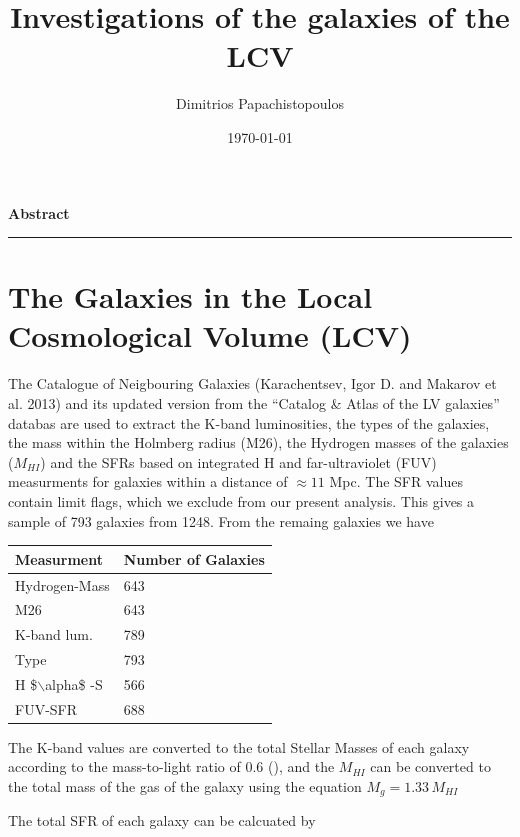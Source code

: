 \documentclass[a4paper]{article}
\author{Dimitrios Papachistopoulos}
\date{\today}
\title{Investigations of the galaxies of the LCV}
\begin{document}
\maketitle
\begin{ABSTRACT}


\textbf{Abstract}

\noindent\rule{\textwidth}{0.5pt}
\end{ABSTRACT}


\section{The Galaxies in the Local Cosmological Volume (LCV)}
\label{sec:org630e55f}

The Catalogue of Neigbouring Galaxies (Karachentsev, Igor D. and Makarov  et al. 2013\autocite{karachentsevUPDATEDNEARBYGALAXY2013}) and its updated version from the ``Catalog \& Atlas of the LV galaxies'' databas\autocite{CatalogLVGalaxies}  are used to extract the K-band luminosities, the types of the galaxies, the mass within the Holmberg radius (M26), the Hydrogen masses of the galaxies (\(M_{HI}\)) and the SFRs based on integrated  H and far-ultraviolet (FUV) measurments for galaxies within a distance of
\(\approx 11\) Mpc. The SFR values contain limit flags, which we exclude from our present analysis. This gives a sample of 793 galaxies from 1248. From the remaing galaxies we have

\begin{center}
\begin{tabular}{|l|l|}
\hline
Measurment & Number of Galaxies \\
\hline
Hydrogen-Mass & 643 \\
M26 & 643 \\
K-band lum. & 789 \\
Type & 793 \\
H \$$\backslash$alpha\$ -S & 566 \\
FUV-SFR & 688 \\
\hline
\end{tabular}
\end{center}

The K-band values are converted to the total Stellar Masses of each galaxy according to the mass-to-light ratio of 0.6 (\cite{lelliSPARCMASSMODELS2016}), and the \(M_{HI}\) can be converted to the total mass of the gas of the galaxy using the equation \(M_g=1.33\,M_{HI}\)

The total SFR of each galaxy can be calcuated by
\end{document}

